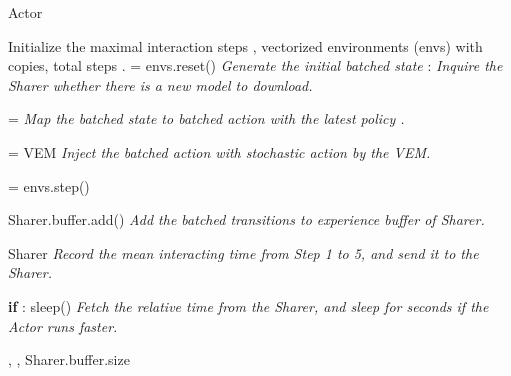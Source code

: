 \documentclass[journal]{IEEEtran}
\begin{document}
\begin{algorithm}[!t]
	\caption{Actor}
	\begin{algorithmic}
		\STATE Initialize the maximal interaction steps , vectorized environments (envs) with  copies, total steps .
		\STATE  = envs.reset() \hspace{0.2cm}  \textit{Generate the initial batched state}
		 :
		\STATE \hspace{0.5cm}   \hspace{0.2cm}  \textit{Inquire the Sharer whether there is a new model to download.}
		
		\STATE \hspace{0.5cm}   =  \hspace{0.2cm}  \textit{Map the batched state to batched action with the latest policy .} 
		
		\STATE \hspace{0.48cm}   = VEM  \hspace{0.2cm}  \textit{Inject the batched action with stochastic action by the VEM.}
		
		\STATE \hspace{0.53cm}   = envs.step()
		
		\STATE \hspace{0.41cm}  Sharer.buffer.add() \hspace{0.2cm}  \textit{Add the batched transitions to experience buffer of Sharer.}
		
		\STATE \hspace{0.5cm}   Sharer \hspace{0.2cm}  \textit{Record the mean interacting time from Step 1 to 5, and send it to the Sharer.}
		
		\STATE \hspace{0.5cm}  \textbf{if}  : sleep() \hspace{0.2cm}  \textit{Fetch the relative time from the Sharer, and sleep for  seconds if the Actor runs faster.}
		
		\STATE \hspace{0.5cm}   , , Sharer.buffer.size 
	\end{algorithmic}
\end{algorithm}
\end{document}
